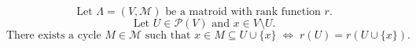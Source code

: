 $$
\text{Let }\Lambda = (V, \mathcal{M})\text{ be a matroid with rank function }r.
$$
$$
\text{Let }U \in \mathcal{P}(V)\text{ and }x \in V \setminus U.
$$
$$
\text{There exists a cycle }M \in \mathcal{M}\text{ such that }x \in M \subseteq U \cup \{x\}
\;\Longleftrightarrow\;
r(U) = r(U \cup \{x\}).
$$
